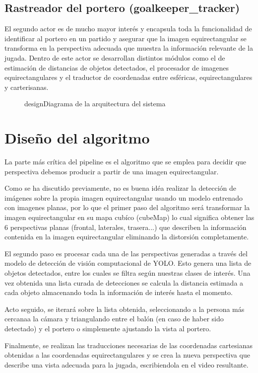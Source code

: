 \subsection{Rastreador del portero (goalkeeper\_tracker)}
El segundo actor es de mucho mayor interés y encapsula toda la funcionalidad de identificar al portero en un partido y asegurar que la imagen equirectangular se transforma en la perspectiva adecuada que muestra la información relevante de la jugada. Dentro de este actor se desarrollan distintos módulos como el de estimación de distancias de objetos detectados, el procesador de imagenes equirectangulares y el traductor de coordenadas entre esféricas, equirectangulares y carterisanas.


\begin{figure}[pie de foto]{design}{Diagrama de la arquitectura del sistema}
	\begin{center}
	\end{center}
\end{figure}

\section{Diseño del algoritmo}
La parte más crítica del pipeline es el algoritmo que se emplea para decidir que perspectiva debemos producir a partir de una imagen equirectangular.

Como se ha discutido previamente, no es buena idéa realizar la detección de imágenes sobre la propia imagen equirectangular usando un modelo entrenado con imagenes planas, por lo que el primer paso del algoritmo será transformar la imagen equirectangular en su mapa cubíco (cubeMap) lo cual significa obtener las 6 perspectivas planas (frontal, laterales, trasera...) que describen la información contenida en la imagen equirectangular eliminando la distorsión completamente.

El segundo paso es procesar cada una de las perspectivas generadas a través del modelo de detección de visión computacional de YOLO. Esto genera una lista de objetos detectados, entre los cuales se filtra según nuestras clases de interés. Una vez obtenida una lista curada de detecciones se calcula la distancia estimada a cada objeto almacenando toda la información de interés hasta el momento.

Acto seguido, se iterará sobre la lista obtenida, seleccionando a la persona más cercanaa la cámara y triangulando entre el balón (en caso de haber sido detectado) y el portero o simplemente ajustando la vista al portero.

Finalmente, se realizan las traducciones necesarias de las coordenadas cartesianas obtenidas a las coordenadas equirectangulares y se crea la nueva perspectiva que describe una vista adecuada para la jugada, escribiendola en el video resultante.

